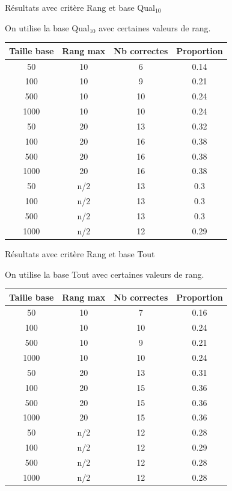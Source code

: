 \documentclass{beamer}
\begin{document}
\begin{frame}{Résultats avec critère Rang et base Qual$_{10}$}

On utilise la base Qual$_{10}$ avec certaines valeurs de rang.
\begin{tabular}{|c|c|c|c|}
   \hline
   Taille base & Rang max & Nb correctes & Proportion\\
   \hline
   50 & 10  & 6 & 0.14  \\
   \hline
   100 & 10  & 9 & 0.21  \\
   \hline
   500 & 10  & 10 & 0.24  \\
   \hline
   1000 & 10 & 10 & 0.24  \\
   \hline
   \hline
   50 & 20  & 13 & 0.32  \\
   \hline
   100 & 20 & 16 & 0.38  \\
   \hline
   500 & 20 & 16 & 0.38  \\
   \hline
   1000 & 20 & 16 & 0.38  \\
   \hline
   \hline
   50 & n/2 & 13 & 0.3  \\
   \hline
   100 & n/2 & 13 & 0.3  \\
   \hline
   500 & n/2 & 13 & 0.3  \\
   \hline
   1000 & n/2 & 12 & 0.29  \\
   \hline
\end{tabular}
\end{frame}

\begin{frame}{Résultats avec critère Rang et base Tout}

On utilise la base Tout avec certaines valeurs de rang.
\begin{tabular}{|c|c|c|c|}
   \hline
   Taille base & Rang max & Nb correctes & Proportion\\
   \hline
   50 & 10  & 7 & 0.16  \\
   \hline
   100 & 10  & 10 & 0.24  \\
   \hline
   500 & 10  & 9 & 0.21  \\
   \hline
   1000 & 10 & 10 & 0.24  \\
   \hline
   \hline
   50 & 20  & 13 & 0.31  \\
   \hline
   100 & 20 & 15 & 0.36  \\
   \hline
   500 & 20 & 15 & 0.36  \\
   \hline
   1000 & 20 & 15 & 0.36  \\
   \hline
   \hline
   50 & n/2 & 12 & 0.28  \\
   \hline
   100 & n/2 & 12 & 0.29  \\
   \hline
   500 & n/2 & 12 & 0.28  \\
   \hline
   1000 & n/2 & 12 & 0.28  \\
   \hline
\end{tabular}
\end{frame}
\end{document}
